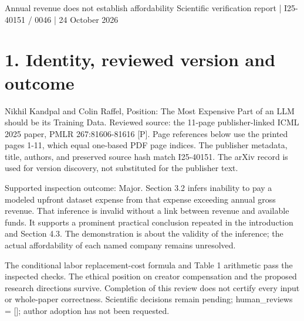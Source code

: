 \documentclass[10pt]{article}
\begin{document}
Annual revenue does not establish affordability
Scientific verification report | I25-40151 / 0046 | 24 October 2026\par
\section*{1. Identity, reviewed version and outcome}
Nikhil Kandpal and Colin Raffel, Position: The Most Expensive Part of an LLM should be its Training Data. Reviewed source: the 11-page publisher-linked ICML 2025 paper, PMLR 267:81606-81616 [P]. Page references below use the printed pages 1-11, which equal one-based PDF page indices. The publisher metadata, title, authors, and preserved source hash match I25-40151. The arXiv record is used for version discovery, not substituted for the publisher text.\par
Supported inspection outcome: Major. Section 3.2 infers inability to pay a modeled upfront dataset expense from that expense exceeding annual gross revenue. That inference is invalid without a link between revenue and available funds. It supports a prominent practical conclusion repeated in the introduction and Section 4.3. The demonstration is about the validity of the inference; the actual affordability of each named company remains unresolved.\par
The conditional labor replacement-cost formula and Table 1 arithmetic pass the inspected checks. The ethical position on creator compensation and the proposed research directions survive. Completion of this review does not certify every input or whole-paper correctness. Scientific decisions remain pending; human\_reviews = []; author adoption has not been requested.\par
\end{document}
